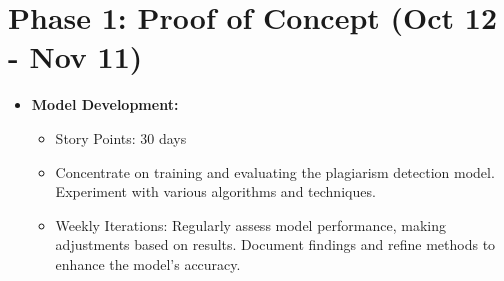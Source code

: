 \documentclass[12pt]{article}
\begin{document}
\section*{Phase 1: Proof of Concept (Oct 12 - Nov 11)}
\begin{itemize}
    \item \textbf{Model Development:}
    \begin{itemize}
        \item Story Points: 30 days
        \item Concentrate on training and evaluating the plagiarism detection model. Experiment with various algorithms and techniques.
        \item Weekly Iterations: Regularly assess model performance, making adjustments based on results. Document findings and refine methods to enhance the model's accuracy.
    \end{itemize}
\end{itemize}
\end{document}
